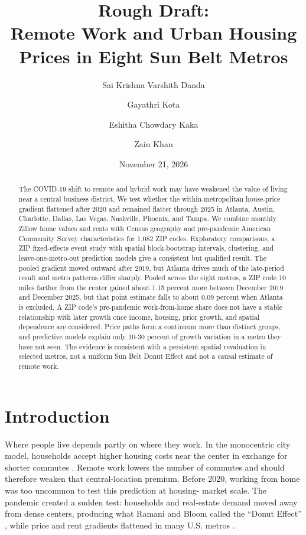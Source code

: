 \documentclass[11pt]{article}
\title{Rough Draft:\\Remote Work and Urban Housing Prices in Eight Sun Belt Metros}
\author[1]{Sai Krishna Varshith Danda}
\author[1]{Gayathri Kota}
\author[1]{Eshitha Chowdary Kaka}
\author[1]{Zain Khan}
\affil[1]{Arizona State University, Tempe, AZ 85281, USA}
\date{November 21, 2026}
\begin{document}
\maketitle

\begin{abstract}
The COVID-19 shift to remote and hybrid work may have weakened the value of living near a central business district. We test
whether the within-metropolitan house-price gradient flattened after 2020 and remained flatter through 2025 in Atlanta, Austin,
Charlotte, Dallas, Las Vegas, Nashville, Phoenix, and Tampa. We combine monthly Zillow home values and rents with Census
geography and pre-pandemic American Community Survey characteristics for 1,082 ZIP codes. Exploratory comparisons, a ZIP
fixed-effects event study with spatial block-bootstrap intervals, clustering, and leave-one-metro-out prediction models give a
consistent but qualified result. The pooled gradient moved outward after 2019, but Atlanta drives much of the late-period result
and metro patterns differ sharply. Pooled across the eight metros, a ZIP code 10 miles farther from the center gained about 1.15
percent more between December 2019 and December 2025, but that point estimate falls to about 0.09 percent when Atlanta is excluded. A
ZIP code's pre-pandemic work-from-home share does not have a stable relationship with later
growth once income, housing, prior growth, and spatial dependence are considered. Price paths form a continuum more than distinct
groups, and predictive models explain only 10-30 percent of growth variation in a metro they have not seen. The evidence is
consistent with a persistent spatial revaluation in selected metros, not a uniform Sun Belt Donut Effect and not a causal estimate
of remote work.
\end{abstract}

\section{Introduction}

Where people live depends partly on where they work. In the monocentric city model, households accept higher housing costs near
the center in exchange for shorter commutes \cite{alonso1964location}. Remote work lowers the number of commutes and should
therefore weaken that central-location premium. Before 2020, working from home was too uncommon to test this prediction at housing-
market scale. The pandemic created a sudden test: households and real-estate demand moved away from dense centers, producing what
Ramani and Bloom called the ``Donut Effect'' \cite{ramani2021donut}, while price and rent gradients flattened in many U.S. metros
\cite{gupta2022flattening}.
\end{document}
